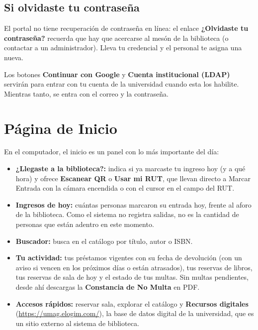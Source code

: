 \documentclass[11pt,a4paper]{report}
\begin{document}
\section{Si olvidaste tu contraseña}

El portal no tiene recuperación de contraseña en línea: el enlace
\textbf{¿Olvidaste tu contraseña?} recuerda que hay que acercarse al mesón
de la biblioteca (o contactar a un administrador). Lleva tu credencial y el
personal te asigna una nueva.

\begin{nota}
Los botones \textbf{Continuar con Google} y \textbf{Cuenta institucional
(LDAP)} servirán para entrar con tu cuenta de la universidad cuando esta
los habilite. Mientras tanto, se entra con el correo y la contraseña.
\end{nota}

\chapter{Página de Inicio}

En el computador, el inicio es un panel con lo más importante del día:


\begin{itemize}
  \item \textbf{¿Llegaste a la biblioteca?:} indica si ya marcaste tu
  ingreso hoy (y a qué hora) y ofrece \textbf{Escanear QR} o \textbf{Usar
  mi RUT}, que llevan directo a Marcar Entrada con la cámara encendida o
  con el cursor en el campo del RUT.
  \item \textbf{Ingresos de hoy:} cuántas personas marcaron su entrada hoy,
  frente al aforo de la biblioteca. Como el sistema no registra salidas, no
  es la cantidad de personas que están adentro en este momento.
  \item \textbf{Buscador:} busca en el catálogo por título, autor o ISBN.
  \item \textbf{Tu actividad:} tus préstamos vigentes con su fecha de
  devolución (con un aviso si vencen en los próximos días o están
  atrasados), tus reservas de libros, tus reservas de sala de hoy y el
  estado de tus multas. Sin multas pendientes, desde ahí descargas la
  \textbf{Constancia de No Multa} en PDF.
  \item \textbf{Accesos rápidos:} reservar sala, explorar el catálogo y
  \textbf{Recursos digitales} (\url{https://umag.elogim.com/}), la base de
  datos digital de la universidad, que es un sitio externo al sistema de
  biblioteca.
\end{itemize}
\end{document}
